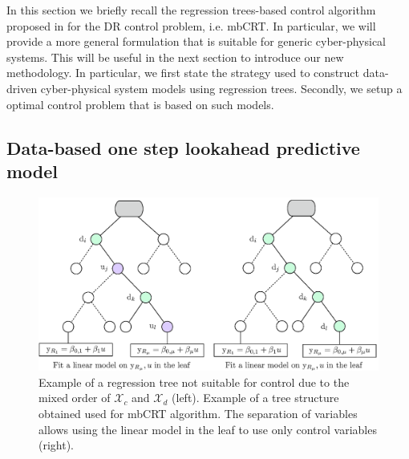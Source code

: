 \textcolor[rgb]{0.00,0.00,1.00}{In this section we briefly recall the regression trees-based control algorithm proposed in \cite{Behl201630} for the DR control problem, i.e. mbCRT. In particular, we will provide a more general formulation that is suitable for generic cyber-physical systems. This will be useful in the next section to introduce our new methodology. In particular, we first state the strategy used to construct data-driven cyber-physical system models using regression trees. Secondly, we setup a optimal control problem that is based on such models.}

\subsection{Data-based one step lookahead predictive model}
\label{sec:mbcrt}

\begin{figure}
\centering
\includegraphics[width=0.95\columnwidth]{Figures/sep_vars.eps}
   \caption{Example of a regression tree not suitable for control due to the mixed order of $\mathcal{X}_c$ and $\mathcal{X}_d$ (left). Example of a tree structure obtained used for mbCRT algorithm. The separation of variables allows using the linear model in the leaf to use only control variables (right).}
   \captionsetup{justification=centering}
   \label{fig:training}
\end{figure}

